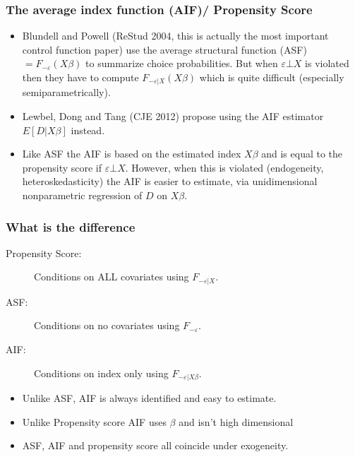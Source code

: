 \documentclass[11pt,dvipsnames,table,aspectratio=169]{beamer}
\begin{document}
\begin{frame}
\frametitle{ The average index function (AIF)/ Propensity Score}
\begin{itemize}
\item Blundell and Powell (ReStud 2004, this is actually the most important control function paper) use the average structural function (ASF) $= F_{-\varepsilon} (X \beta) $ to summarize choice probabilities. But when $\varepsilon \bot X$ is violated then they have to compute $F_{-\varepsilon | X} (X \beta) $ which is quite difficult (especially semiparametrically).
\item Lewbel, Dong and Tang (CJE 2012) propose using the AIF estimator $E[D | X \beta]$ instead.
\item Like ASF the AIF is based on the estimated index $X \beta$ and is equal to the propensity score if $\varepsilon \bot X$. However, when this is violated (endogeneity, heteroskedasticity) the AIF is easier to estimate, via unidimensional nonparametric regression of $D$ on $X \beta$.
\end{itemize}
\end{frame}

\begin{frame}
\frametitle{ What is the difference}
\begin{description}
\item[Propensity Score: ]  Conditions on ALL covariates using $F_{-\varepsilon | X}$.
\item[ASF: ]  Conditions on no covariates using $F_{-\varepsilon }$.
\item[AIF: ]  Conditions on index only  using $F_{-\varepsilon | X \beta}$.
\end{description} 

\begin{itemize}
\item Unlike ASF, AIF is always identified and easy to estimate.
\item Unlike Propensity score AIF uses $\beta$ and isn't high dimensional
\item ASF, AIF and propensity score all coincide under exogeneity.
\end{itemize}
\end{frame}
\end{document}
